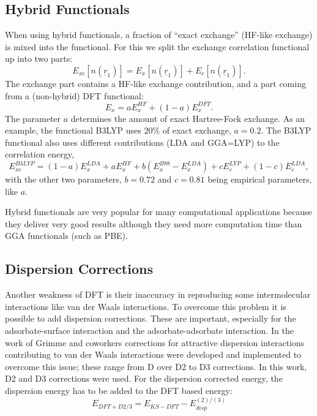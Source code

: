 \documentclass[11pt,DIV=13,BCOR=5mm,a4paper,headinclude]{scrbook}
\renewcommand{\vec}[1]{\underline{#1}}
\begin{document}
\subsection{Hybrid Functionals}
When using hybrid functionals, a fraction of ``exact exchange'' (HF-like exchange) is mixed into the functional.
For this we split the exchange correlation functional up into two parts:
\begin{equation}
 E_{xc}[n(\vec{r}_1)]=  E_{x}[n(\vec{r}_1)] + E_{c}[n(\vec{r}_1)].
\end{equation}
The exchange part contains a HF-like exchange contribution, and a part coming from a (non-hybrid) DFT functional:
\begin{equation}
 E_x = aE_x^{HF} + (1-a)E_x^{DFT}.
\end{equation}
The parameter $a$ determines the amount of exact Hartree-Fock exchange.
As an example, the functional B3LYP uses $20\%$ of exact exchange\cite{Becke1993}, $a=0.2$.
The B3LYP functional also uses different contributions (LDA and GGA=LYP) to the correlation energy,
\begin{equation}
E_{xc}^{B3LYP}=(1-a)E_x^{LDA} + aE_x^{HF} +b(E_x^{B88} - E_x^{LDA}) + cE_c^{LYP} + (1-c)E_c^{LDA},
\end{equation}
with the other two parameters, $b=0.72$ and $c=0.81$ being empirical parameters, like $a$.


Hybrid functionals are very popular for many computational applications because they deliver very good results although they need more computation time than GGA functionals (such as PBE).

\subsection{Dispersion Corrections}
Another weakness of DFT is their inaccuracy in reproducing some intermolecular interactions like van der Waals interactions.
To overcome this problem it is possible to add dispersion corrections.
These are important, especially for the adsorbate-surface interaction and the adsorbate-adsorbate interaction.
In the work of Grimme\cite{Grimme06} and coworkers corrections for attractive dispersion interactions contributing to van der Waals interactions were developed and implemented to overcome this issue; these range from D over D2 to D3 corrections.
In this work, D2 and D3 corrections were used.
For the dispersion corrected energy, the dispersion energy has to be added to the DFT based energy:
\begin{equation}
E_{DFT+D2/3}=E_{KS-DFT} - E_{disp}^{(2)/(3)}
\end{equation}
\end{document}
